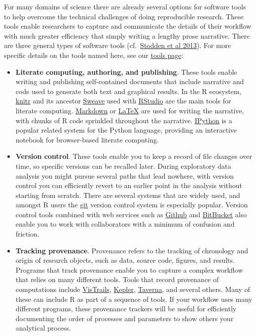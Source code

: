 \documentclass[
]{book}
\begin{document}
For many domains of science there are already several options for software tools to help overcome the technical challenges of doing reproducible research. These tools enable researchers to capture and communicate the details of their workflow with much greater efficiency that simply writing a lengthy prose narrative. There are three general types of software tools (cf.~\href{http://stodden.net/icerm_report.pdf}{Stodden et al 2013}). For more specific details on the tools named here, see our \href{http://ropensci.github.io/reproducibility-guide/sections/tools/}{tools page}:

\begin{itemize}
\item
  \textbf{Literate computing, authoring, and publishing}. These tools enable writing and publishing self-contained documents that include narrative and code used to generate both text and graphical results. In the R ecosystem, \href{http://yihui.name/knitr/}{knitr} and its ancestor \href{http://www.stat.uni-muenchen.de/~leisch/Sweave/}{Sweave} used with \href{https://www.rstudio.com/}{RStudio} are the main tools for literate computing. \href{http://daringfireball.net/projects/markdown/}{Markdown} or \href{http://www.latex-project.org/}{LaTeX} are used for writing the narrative, with chunks of R code sprinkled throughout the narrative. \href{http://ipython.org/}{IPython} is a popular related system for the Python language, providing an interactive notebook for browser-based literate computing.
\item
  \textbf{Version control}. These tools enable you to keep a record of file changes over time, so specific versions can be recalled later. During exploratory data analysis you might pursue several paths that lead nowhere, with version control you can efficiently revert to an earlier point in the analysis without starting from scratch. There are several systems that are widely used, and amongst R users the \href{http://git-scm.com/}{git} version control system is especially popular. Version control tools combined with web services such as \href{https://github.com/}{Github} and \href{https://bitbucket.org/}{BitBucket} also enable you to work with collaborators with a minimum of confusion and friction.
\item
  \textbf{Tracking provenance}. Provenance refers to the tracking of chronology and origin of research objects, such as data, source code, figures, and results. Programs that track provenance enable you to capture a complex workflow that relies on many different tools. Tools that record provenance of computations include \href{http://www.vistrails.org/}{VisTrails}, \href{https://kepler-project.org/}{Kepler}, \href{http://www.taverna.org.uk/}{Taverna}, and several others. Many of these can include R as part of a sequence of tools. If your workflow uses many different programs, these provenance trackers will be useful for efficiently documenting the order of processes and parameters to show others your analytical process.

\end{itemize}
\end{document}
